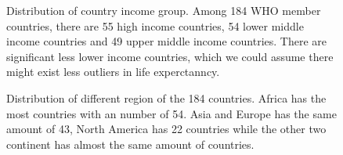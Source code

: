 \documentclass[
  letterpaper,
  DIV=11,
  numbers=noendperiod]{scrartcl}
\begin{document}
\begin{figure}


\caption{\label{fig-income}Distribution of country income group. Among
184 WHO member countries, there are 55 high income countries, 54 lower
middle income countries and 49 upper middle income countries. There are
significant less lower income countries, which we could assume there
might exist less outliers in life experctanncy.}

\end{figure}%

\begin{figure}


\caption{\label{fig-region}Distribution of different region of the 184
countries. Africa has the most countries with an number of 54. Asia and
Europe has the same amount of 43, North America has 22 countries while
the other two continent has almost the same amount of countries.}

\end{figure}%
\end{document}
